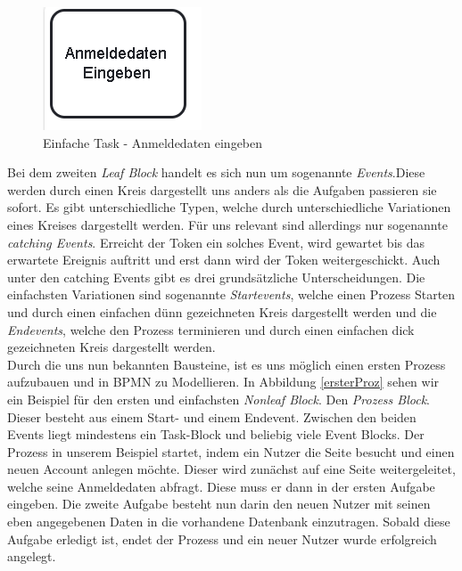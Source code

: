 \begin{figure}
\centering
\includegraphics[scale=1.0]{Figures/Beispiel1}
\decoRule
\caption[Einfache Task]{Einfache Task - Anmeldedaten eingeben}
\label{Task}
\end{figure}Bei dem zweiten \textit{Leaf Block} handelt es sich nun um sogenannte \textit{Events}.Diese werden durch einen Kreis dargestellt uns anders als die Aufgaben passieren sie sofort. Es gibt unterschiedliche Typen, welche durch unterschiedliche Variationen eines Kreises dargestellt werden. Für uns relevant sind allerdings nur sogenannte \textit{catching Events}.  Erreicht der Token ein solches Event, wird gewartet bis das erwartete Ereignis auftritt und erst dann wird der Token weitergeschickt. Auch unter den catching Events gibt es drei grundsätzliche Unterscheidungen. Die einfachsten Variationen sind sogenannte \textit{Startevents}, welche einen Prozess Starten und durch einen einfachen dünn gezeichneten Kreis dargestellt werden und die \textit{Endevents}, welche den Prozess terminieren und durch einen einfachen dick gezeichneten Kreis dargestellt werden.\\
Durch die uns nun bekannten Bausteine, ist es uns möglich einen ersten Prozess aufzubauen und in BPMN zu Modellieren. In Abbildung \ref{ersterProz} sehen wir ein Beispiel für den ersten und einfachsten \textit{Nonleaf Block}. Den \textit{Prozess Block}. Dieser besteht aus einem Start- und einem Endevent. Zwischen den beiden Events liegt mindestens ein Task-Block und beliebig viele Event Blocks. Der Prozess in unserem Beispiel startet, indem ein Nutzer die Seite besucht und einen neuen Account anlegen möchte. Dieser wird zunächst auf eine Seite weitergeleitet, welche seine Anmeldedaten abfragt. Diese muss er dann in der ersten Aufgabe eingeben. Die zweite Aufgabe besteht nun darin den neuen Nutzer mit seinen eben angegebenen Daten in die vorhandene Datenbank einzutragen. Sobald diese Aufgabe erledigt ist, endet der Prozess und ein neuer Nutzer wurde erfolgreich angelegt.\\
